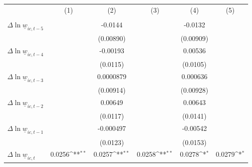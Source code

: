 {
\def\sym#1{\ifmmode^{#1}\else\(^{#1}\)\fi}
\begin{tabular}{l*{5}{c}}
\hline\hline
          &&&&&\\
          &&&&&\\
\hline
$\Delta \ln \underline{w}_{ic,t-5}$&                  &  -0.0144         &                  &  -0.0132         &                  \\
          &                  &(0.00890)         &                  &(0.00909)         &                  \\
[1em]
$\Delta \ln \underline{w}_{ic,t-4}$&                  & -0.00193         &                  &  0.00536         &                  \\
          &                  & (0.0115)         &                  & (0.0105)         &                  \\
[1em]
$\Delta \ln \underline{w}_{ic,t-3}$&                  &0.0000879         &                  & 0.000636         &                  \\
          &                  &(0.00914)         &                  &(0.00928)         &                  \\
[1em]
$\Delta \ln \underline{w}_{ic,t-2}$&                  &  0.00649         &                  &  0.00643         &                  \\
          &                  & (0.0117)         &                  & (0.0141)         &                  \\
[1em]
$\Delta \ln \underline{w}_{ic,t-1}$&                  &-0.000497         &                  & -0.00542         &                  \\
          &                  & (0.0123)         &                  & (0.0153)         &                  \\
[1em]
$\Delta \ln \underline{w}_{ic,t}$&   0.0256\sym{**} &   0.0257\sym{**} &   0.0258\sym{**} &   0.0278\sym{*}  &   0.0279\sym{*}  \\

\end{tabular}}
